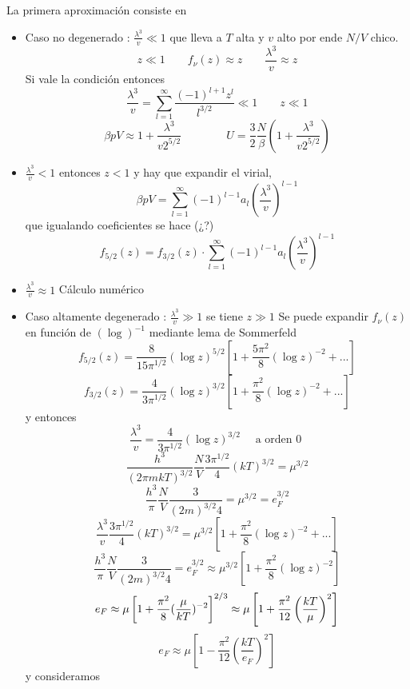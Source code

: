 \documentclass[10pt,oneside]{CBFT_book}
\begin{document}
La primera aproximación consiste en 
\begin{itemize}
 \item Caso no degenerado : $\frac{\lambda^3}{v} \ll 1 $  que lleva a $ T $ alta y $ v $ alto
 por ende $ N/V $ chico.
 \[	
	z \ll 1 \qquad f_\nu(z) \approx z \qquad \frac{\lambda^3}{v} \approx z
 \]
 Si vale la condición entonces 
 \[
	\frac{\lambda^3}{v} = \sum_{l=1}^\infty \frac{(-1)^{l+1} z^l }{l^{3/2}} \ll 1 \qquad z \ll 1
 \]
 \[
	\beta p V \approx 1 + \frac{\lambda^3}{v 2^{5/2}} \qquad \qquad U = \frac{3}{2} \frac{N}{\beta}
	\left( 1 + \frac{\lambda^3}{v 2^{5/2}} \right)
 \]
 \item $\frac{\lambda^3}{v} < 1 $ entonces $ z < 1 $ y hay que expandir el virial,
 \[
	\beta p V = \sum_{l=1}^\infty (-1)^{l-1} a_l \left(\frac{\lambda^3}{v} \right)^{l-1}
 \]
 que igualando coeficientes se hace (¿?)
 \[
	f_{5/2}(z) = f_{3/2}(z) \cdot \sum_{l=1}^\infty (-1)^{l-1} a_l \left(\frac{\lambda^3}{v} \right)^{l-1}
 \]
 \item $\frac{\lambda^3}{v} \approx 1 $ Cálculo numérico
 \item Caso altamente degenerado : $\frac{\lambda^3}{v} \gg 1 $ se tiene $ z \gg 1 $ 
 Se puede expandir $ f_\nu(z) $ en función de $ (\log )^{-1} $ mediante lema de Sommerfeld
 \[
	f_{5/2}(z) = \frac{8}{15\pi^{1/2}} (\log z)^{5/2} \left[ 1 + \frac{5\pi^2}{8}(\log z)^{-2} + ... \right]
 \]
 \[
	f_{3/2}(z) = \frac{4}{3\pi^{1/2}} (\log z)^{3/2} \left[ 1 + \frac{\pi^2}{8}(\log z)^{-2} + ... \right]
 \]
 y entonces
 \[
	\frac{\lambda^3}{v} = \frac{4}{3\pi^{1/2}} (\log z)^{3/2}  \quad \text{ a orden 0 }
 \]
 \[
	\frac{h^3}{ (2\pi mkT)^{3/2} } \frac{N}{V} \frac{3\pi^{1/2}}{4} (kT)^{3/2} = \mu^{ 3/2 }
 \]
 \[
	\frac{ h^3 }{ \pi } \frac{ N }{ V } \frac{ 3 }{ ( 2m )^{ 3/2 } 4 } = \mu^{ 3/2 } = e_F^{3/2}
 \]
 \[
	\frac{\lambda^3}{v}\frac{3\pi^{1/2}}{4} (kT)^{3/2} = 
	\mu^{3/2}\left[ 1 + \frac{\pi^2}{8}(\log z)^{-2} + ... \right]
 \]
 \[
	\frac{ h^3 }{ \pi } \frac{ N }{ V } \frac{ 3 }{ ( 2m )^{ 3/2 } 4 } = e_F^{3/2} \approx
	\mu^{3/2} \left[ 1 + \frac{\pi^2}{8}(\log z)^{-2} \right]
 \]
 \[
	e_F \approx \mu \left[ 1 + \frac{\pi^2}{8}( \frac{ \mu }{ kT } )^{-2} \right]^{ 2/3 } \approx 
	\mu \left[ 1 + \frac{\pi^2}{12} \left( \frac{  kT  }{  \mu  } \right)^{2} \right]
 \]
 \[
	e_F \approx \mu \left[ 1 - \frac{\pi^2}{12}( \frac{ kT }{ e_F } )^{2} \right]
 \]
 y consideramos

\end{itemize}
\end{document}
